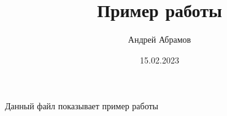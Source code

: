 \documentclass[12pt, letterpaper, twoside]{article}
\title{Пример работы}
\author{Андрей Абрамов}
\date{15.02.2023}
\begin{document}
\maketitle

Данный файл показывает пример работы
\end{document}
